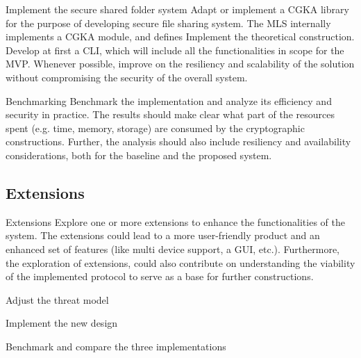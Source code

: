 \documentclass[E]{BAMASA}
\begin{document}
\begin{workpackage}{Implement the secure shared folder system}\label{wp:impl-ssf}
    Adapt or implement a CGKA library for the purpose of developing secure file sharing system. The MLS internally implements a CGKA module, and defines  
	Implement the theoretical construction. Develop at first a CLI, which will include all the functionalities in scope for the MVP. Whenever possible, improve on the resiliency and scalability of the solution without compromising the security of the overall system.
\end{workpackage}

\begin{workpackage}{Benchmarking}\label{wp:benchmark}
	Benchmark the implementation and analyze its efficiency and security in practice. The results should make clear what part of the resources spent (e.g. time, memory, storage) are consumed by the cryptographic constructions. Further, the analysis should also include resiliency and availability considerations, both for the baseline and the proposed system.  
\end{workpackage}

\subsection{Extensions}

\begin{workpackage}{Extensions}\label{wp:extension}
	Explore one or more extensions to enhance the functionalities of the system. The extensions could lead to a more user-friendly product and an enhanced set of features (like multi device support, a GUI, etc.). Furthermore, the exploration of extensions, could also contribute on understanding the viability of the implemented protocol to serve as a base for further constructions.
\end{workpackage}

\begin{workpackage}{Adjust the threat model}\label{wp:adjusted-thread-model}
    
\end{workpackage}

\begin{workpackage}{Implement the new design}\label{wp:new-design}
    
\end{workpackage}

\begin{workpackage}{Benchmark and compare the three implementations}\label{wp:new-implementation}
    
\end{workpackage}


\gradingMA





\end{document}
